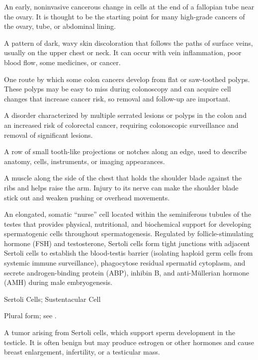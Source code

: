  An early, noninvasive cancerous change in cells at the end of a fallopian tube near the ovary. It is thought to be the starting point for many high-grade cancers of the ovary, tube, or abdominal lining.

 A pattern of dark, wavy skin discoloration that follows the paths of surface veins, usually on the upper chest or neck. It can occur with vein inflammation, poor blood flow, some medicines, or cancer.

 One route by which some colon cancers develop from flat or saw-toothed polyps. These polyps may be easy to miss during colonoscopy and can acquire cell changes that increase cancer risk, so removal and follow-up are important.

 A disorder characterized by multiple serrated lesions or polyps in the colon and an increased risk of colorectal cancer, requiring colonoscopic surveillance and removal of significant lesions.

 A row of small tooth-like projections or notches along an edge, used to describe anatomy, cells, instruments, or imaging appearances.

 A muscle along the side of the chest that holds the shoulder blade against the ribs and helps raise the arm. Injury to its nerve can make the shoulder blade stick out and weaken pushing or overhead movements.

 An elongated, somatic ``nurse'' cell located within the seminiferous tubules of the testes that provides physical, nutritional, and biochemical support for developing spermatogenic cells throughout spermatogenesis. Regulated by follicle-stimulating hormone (FSH) and testosterone, Sertoli cells form tight junctions with adjacent Sertoli cells to establish the blood-testis barrier (isolating haploid germ cells from systemic immune surveillance), phagocytose residual spermatid cytoplasm, and secrete androgen-binding protein (ABP), inhibin B, and anti-Müllerian hormone (AMH) during male embryogenesis.

\synonyms
Sertoli Cells; Sustentacular Cell

 Plural form; see .

 A tumor arising from Sertoli cells, which support sperm development in the testicle. It is often benign but may produce estrogen or other hormones and cause breast enlargement, infertility, or a testicular mass.

